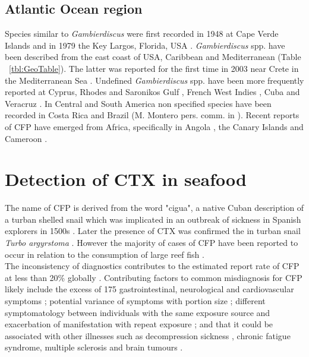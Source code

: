 \documentclass[12pt]{article}
\begin{document}
\subsection{Atlantic Ocean region}
Species similar to \emph{Gambierdiscus} were first recorded in 1948 at Cape Verde Islands \cite{silva1956contribution} and in 1979 the Key Largos, Florida, USA \cite{taylor1979description}.
\emph{Gambierdiscus} spp. have been described from the east coast of USA, Caribbean and Mediterranean (Table ~\ref{tbl:GeoTable}). The latter was reported for the first time in 2003 near Crete in the Mediterranean Sea  \cite{aligizaki2008morphological,zenetos2009aquatic}.
Undefined \emph{Gambierdiscus} spp. have been more frequently reported at Cyprus, Rhodes and Saronikos Gulf \cite{aligizaki2009toxic,aligizaki2010diversity}, French West Indies \cite{lobel1988assessment}, Cuba \cite{delgado2006epiphytic} and Veracruz \cite{okolodkov2007seasonal}.
In Central and South America non specified species have been recorded in Costa Rica and Brazil (M. Montero pers. comm. in \cite{parsons2012gambierdiscus}).
Recent reports of CFP have emerged from Africa, specifically in Angola \cite{berdalet2012global}, the Canary Islands \cite{boada2010ciguatera} and Cameroon \cite{bienfang2008ciguatera}. %

\section{Detection of CTX in seafood}
The name of CFP is derived from the word "cigua", a native Cuban description of a turban shelled snail which was implicated in an outbreak of sickness in Spanish explorers in 1500s \cite{gudger1930poisonous}. Later the presence of CTX was confirmed the in turban snail \emph{Turbo argyrstoma} \cite{yasumoto1976toxicity}. However the majority of cases of CFP have been reported to occur in relation to the consumption of large reef fish \cite{hokama2001ciguatera,lewis2001changing,dechraoui2005use,laurent2005ciguatera}. \\

The inconsistency of diagnostics contributes to the estimated report rate of CFP at less than 20\% globally \cite{dickey2010ciguatera}. Contributing factors to common misdiagnosis for CFP likely include the excess of 175 gastrointestinal, neurological and cardiovascular symptoms \cite{sims1987theoretical}; potential variance of symptoms with portion size \cite{wong2008features,mak2013pacific}; different symptomatology between individuals with the same exposure source and exacerbation of manifestation with repeat exposure \cite{bagnis1979clinical,glaziou1993study}; and that it could be associated with other illnesses such as decompression sickness \cite{adams1993outbreak}, chronic fatigue syndrome, multiple sclerosis \cite{lindsay1997chronic,ting2001ciguatera} and brain tumours \cite{lindsay1997chronic}. \\
\end{document}
